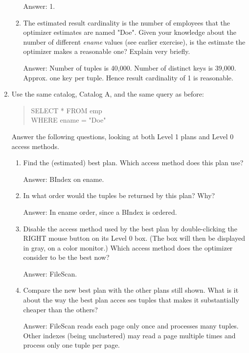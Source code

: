 \begin{enumerate}
\begin{enumerate}
Answer: 1.

\item
The estimated result cardinality is the number of employees that the
optimizer estimates are named "Doe".  Given your knowledge about the
number of different {\em ename} values (see earlier exercise), is the
estimate the optimizer makes a reasonable one? Explain very briefly.

Answer: Number of tuples is 40,000.  Number of distinct keys is 39,000.
Approx. one key per tuple.  Hence result cardinality of 1 is reasonable.
\end{enumerate}


\item
Use the same catalog, Catalog A, and the same query as before:
\begin{quote}
        SELECT * FROM emp\\
        WHERE ename = "Doe"
\end{quote}

Answer the following questions, looking at both Level 1 plans and Level
0 access methods.

\begin{enumerate}
\item
Find the (estimated) best plan.  Which access method does this plan use?

Answer: BIndex on ename.

\item
In what order would the tuples be returned by this plan?  Why?

Answer: In ename order, since a BIndex is ordered.

\item
Disable the access method used by the best plan by double-clicking the
RIGHT mouse button on its Level 0 box.  (The box will then be displayed
in gray, on a color monitor.)  Which access method does the optimizer
consider to be the best now?

Answer: FileScan.

\item
Compare the new best plan with the other plans still shown.  What is it about the way the best
plan acces
ses tuples that makes it substantially cheaper than the others?

Answer: FileScan reads each page only once and processes many tuples.
Other indexes (being unclustered) may read a page multiple times and
process only one tuple per page.
\end{enumerate}



\end{enumerate}
